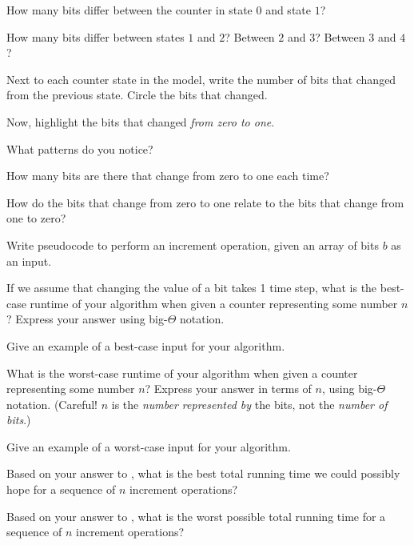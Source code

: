 \documentclass{tufte-handout}
\begin{document}
\begin{questions}
  \item How many bits differ between the counter in state $0$ and
    state $1$?
  \item How many bits differ between states $1$ and $2$?  Between $2$
    and $3$?  Between $3$ and $4$?
  \item Next to each counter state in the model, write the number of
    bits that changed from the previous state.  Circle the bits that
    changed.
  \item Now, highlight the bits that changed \emph{from zero to one}.
  \item What patterns do you notice?
  \item How many bits are there that change from zero to one each
    time?
  \item How do the bits that change from zero to one relate to the
    bits that change from one to zero?
  \item Write pseudocode to perform an increment operation, given an
    array of bits $b$ as an input. \vspace{1in}
  \item \label{q:inc-best} If we assume that changing the value of a
    bit takes 1 time step, what is the best-case runtime of your
    algorithm when given a counter representing some number $n$?
    Express your answer using big-$\Theta$ notation.
  \item Give an example of a best-case input for your algorithm.
  \item \label{q:inc-worst} What is the worst-case runtime of your
    algorithm when given a counter representing some number $n$?
    Express your answer in terms of $n$, using big-$\Theta$
    notation. (Careful!  $n$ is the \emph{number represented by} the
    bits, not the \emph{number of bits}.)
  \item Give an example of a worst-case input for your algorithm.
  \item Based on your answer to , what is the best
    total running time we could possibly hope for a sequence of $n$
    increment operations?
  \item \label{q:worst-total} Based on your answer to
    , what is the worst possible total running time
    for a sequence of $n$ increment operations?
  \end{questions}

\pause
\end{document}
